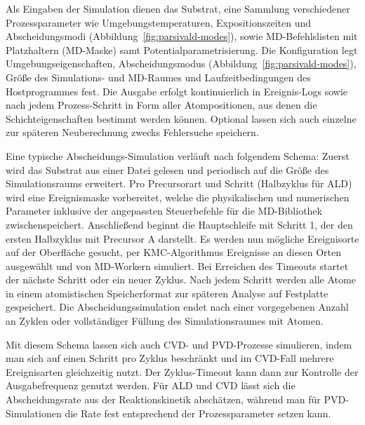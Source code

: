 Als Eingaben der Simulation dienen das Substrat, eine Sammlung verschiedener Prozessparameter wie Umgebungstemperaturen, Expositionszeiten und Abscheidungsmodi (Abbildung~\ref{fig:parsivald-modes}), sowie MD-Befehlslisten mit Platzhaltern (MD-Maske) samt Potentialparametrisierung.
Die Konfiguration legt Umgebungseigenschaften, Abscheidungsmodus (Abbildung~\ref{fig:parsivald-modes}), Größe des Simulations- und MD-Raumes und Laufzeitbedingungen des Hostprogrammes fest.
Die Ausgabe erfolgt kontinuierlich in Ereignis-Logs sowie nach jedem Prozess-Schritt in Form aller Atompositionen, aus denen die Schichteigenschaften bestimmt werden können.
Optional lassen sich auch einzelne zur späteren Neuberechnung zwecks Fehlersuche speichern.

Eine typische Abscheidungs-Simulation verläuft nach folgendem Schema:
Zuerst wird das Substrat aus einer Datei gelesen und periodisch auf die Größe des Simulationsraums erweitert.
Pro Precursorart und Schritt (Halbzyklus für ALD) wird eine Ereignismaske vorbereitet, welche die physikalischen und numerischen Parameter inklusive der angepassten Steuerbefehle für die MD-Bibliothek zwischenspeichert.
Anschließend beginnt die Hauptschleife mit Schritt 1, der den ersten Halbzyklus mit Precursor A darstellt.
Es werden nun mögliche Ereignisorte auf der Oberfläche gesucht, per KMC-Algorithmus Ereignisse an diesen Orten ausgewählt und von MD-Workern simuliert.
Bei Erreichen des Timeouts startet der nächste Schritt oder ein neuer Zyklus.
Nach jedem Schritt werden alle Atome in einem atomistischen Speicherformat zur späteren Analyse auf Festplatte gespeichert.
Die Abscheidungssimulation endet nach einer vorgegebenen Anzahl an Zyklen oder vollständiger Füllung des Simulationsraumes mit Atomen.

Mit diesem Schema lassen sich auch CVD- und PVD-Prozesse simulieren, indem man sich auf einen Schritt pro Zyklus beschränkt und im CVD-Fall mehrere Ereignisarten gleichzeitig nutzt.
Der Zyklus-Timeout kann dann zur Kontrolle der Ausgabefrequenz genutzt werden.
Für ALD und CVD lässt sich die Abscheidungsrate aus der Reaktionskinetik abschätzen, während man für PVD-Simulationen die Rate fest entsprechend der Prozessparameter setzen kann.

